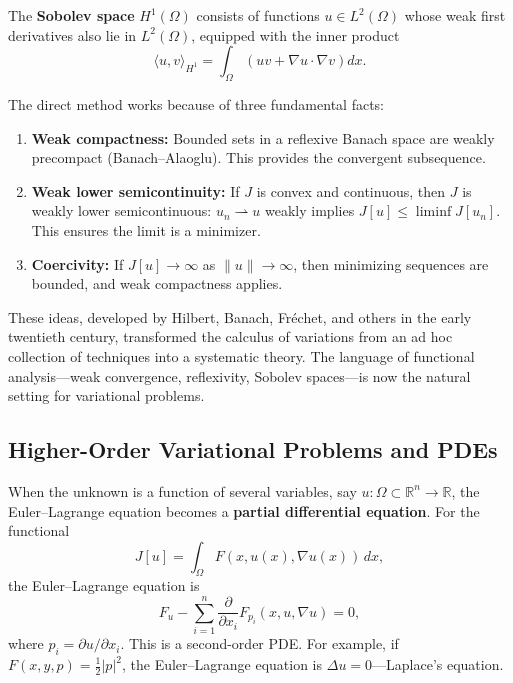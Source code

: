 \begin{definition}
The \textbf{Sobolev space} $H^1(\Omega)$ consists of functions $u \in L^2(\Omega)$ whose weak first derivatives also lie in $L^2(\Omega)$, equipped with the inner product
\[
    \langle u, v \rangle_{H^1} = \int_\Omega \left( uv + \nabla u \cdot \nabla v \right) dx.
\]
\end{definition}

The direct method works because of three fundamental facts:

\begin{enumerate}
    \item \textbf{Weak compactness:} Bounded sets in a reflexive Banach space are weakly precompact (Banach--Alaoglu). This provides the convergent subsequence.
    \item \textbf{Weak lower semicontinuity:} If $J$ is convex and continuous, then $J$ is weakly lower semicontinuous: $u_n \rightharpoonup u$ weakly implies $J[u] \leq \liminf J[u_n]$. This ensures the limit is a minimizer.
    \item \textbf{Coercivity:} If $J[u] \to \infty$ as $\|u\| \to \infty$, then minimizing sequences are bounded, and weak compactness applies.
\end{enumerate}

These ideas, developed by Hilbert, Banach, Fr\'echet, and others in the early twentieth century, transformed the calculus of variations from an ad hoc collection of techniques into a systematic theory. The language of functional analysis---weak convergence, reflexivity, Sobolev spaces---is now the natural setting for variational problems.

\subsection{Higher-Order Variational Problems and PDEs}

When the unknown is a function of several variables, say $u: \Omega \subset \mathbb{R}^n \to \mathbb{R}$, the Euler--Lagrange equation becomes a \textbf{partial differential equation}. For the functional
\[
    J[u] = \int_\Omega F(x, u(x), \nabla u(x)) \, dx,
\]
the Euler--Lagrange equation is
\[
    F_u - \sum_{i=1}^n \frac{\partial}{\partial x_i} F_{p_i}(x, u, \nabla u) = 0,
\]
where $p_i = \partial u / \partial x_i$. This is a second-order PDE. For example, if $F(x, y, p) = \frac{1}{2}|p|^2$, the Euler--Lagrange equation is $\Delta u = 0$---Laplace's equation.

